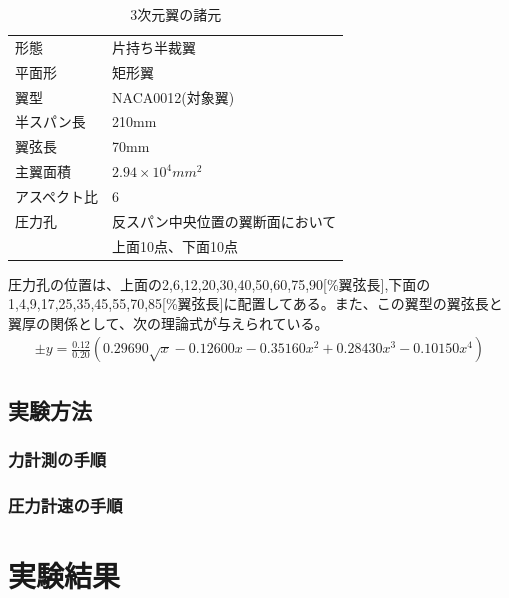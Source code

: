 \documentclass[a4j,twoside,openright,11pt]{jarticle}
\begin{document}
\begin{table}[htb]
\begin{center}
  \caption{3次元翼の諸元}
  \begin{tabular}{ll} \hline
形態&片持ち半裁翼\\
平面形&矩形翼\\
翼型&NACA0012(対象翼)\\
半スパン長&210mm\\
翼弦長&70mm\\
主翼面積&$2.94 \times 10^{4}mm^2$\\
アスペクト比&6\\
圧力孔&反スパン中央位置の翼断面において\\
&上面10点、下面10点\\
\hline
  \end{tabular}
\end{center}
\end{table}
圧力孔の位置は、上面の2,6,12,20,30,40,50,60,75,90[\%翼弦長],下面の1,4,9,17,25,35,45,55,70,85[\%翼弦長]に配置してある。また、この翼型の翼弦長と翼厚の関係として、次の理論式が与えられている。
\begin{eqnarray}
\pm y = \frac{0.12}{0.20}\left(0.29690\sqrt{x} -0.12600x -0.35160x^2 +0.28430x^3 -0.10150x^4 \right)
\end{eqnarray}

\subsection{実験方法}
\subsubsection{力計測の手順}

\subsubsection{圧力計速の手順}

\section{実験結果}
\end{document}
